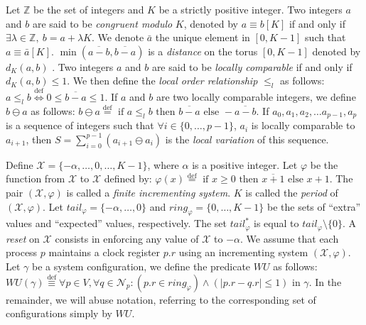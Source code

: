 \documentclass[11pt]{article}
\newcommand{\mN}   {\mathcal{N}}
\newcommand{\mX}   {\mathcal{X}}
\newcommand{\bbZ}   {\mathbb{Z}}
\newcommand{\text}[1]{\mbox{#1}}
\begin{document}
Let $\bbZ$ be the set of integers and $K$ be a strictly positive integer.
Two integers $a$ and $b$ are said to be \emph{congruent modulo} $K$, denoted by
$a\equiv b [K]$ if and only if $\exists \lambda \in \bbZ,\
b = a + \lambda K$. We denote $\bar{a}$ the unique element in $[0,K-1]$
such that $a \equiv \bar{a} [K]$.  $\min ( \overline{a-b}, \overline{b-a})$ is a \emph{distance} 
on the torus $[0,K-1]$ denoted by $d_K (a,b)$  . 
Two integers $a$ and $b$ are said to be \emph{locally comparable}  if and only if
 $d_K (a,b) \leq 1$.  We then define
the \emph{local order relationship} $\leq_l$ as follows: 
$
a\leq_l b \stackrel{\mathrm{def}}{\Leftrightarrow} 0 \leq \overline{b-a} \leq 1
$.
If $a$ and $b$ are two locally comparable integers,  we define  
$b \ominus a $ as follows:
$
b \ominus a \stackrel{\mathrm{def}}{=} \mbox{  if } a \leq _l b \mbox{ then } \overline{b-a} \mbox{ else }  - \overline{a-b}    
$.
If $a_0, a_1, a_2,\ldots a_{p-1}, a_p$ is a sequence of integers such that 
$\forall i \in \{0,\ldots,p-1\}$, $a_i$ is locally comparable to $a_{i+1}$,
then $S=\sum \limits_{i=0}^{p-1}\left( a_{i+1} \ominus a_i\right) $ is the \emph{local variation} of this sequence. 


Define $\mX = \{-\alpha,\ldots,0,\ldots,K-1\}$, where $\alpha$ is a positive integer. 
Let $\varphi$ be the function from $\mX$ to $\mX$ defined by:
$
\varphi (x) \stackrel{\mathrm{def}}{=} \mbox{  if } x \geq 0 \mbox{ then } \overline{x+1} \mbox{ else }  x+1    
$.
The pair $(\mX,\varphi)$ is called a \emph{finite incrementing system}. $K$ is called the \emph{period} of $(\mX, \varphi)$.
Let $tail_{\varphi}=\{-\alpha,\ldots,0\}$ and $ring_{\varphi}=\{0,\ldots,K-1\}$ be the sets of 
``extra'' values and ``expected'' values, respectively.
The set $tail_\varphi ^*$ is equal to $tail_\varphi \setminus \{0\}$.
A \emph{reset} on $\mX$ consists in enforcing any value of $\mX $ to $-\alpha$.  
We assume that each process $p$ maintains a clock register $p.r$ using an incrementing system $(\mX,\varphi)$. 
Let $\gamma $ be a system configuration, we define the predicate $WU$ as follows:
$
WU(\gamma ) \stackrel{\mathrm{def}}{\equiv} \forall p \in V,\forall q\in \mN_p:(p.r \in ring_{\varphi })\wedge (  | p.r - q.r | \leq 1)  \text{ in } \gamma
$.
In the remainder, we will abuse notation, referring to the corresponding set of 
configurations simply by $WU$. 
\end{document}

